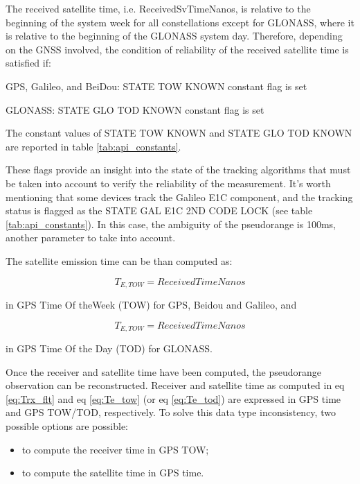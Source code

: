 The received satellite time, i.e. ReceivedSvTimeNanos, is relative to the beginning of the system week for all constellations except for GLONASS, where it is relative to the beginning of the GLONASS system day. Therefore, depending on the GNSS involved, the condition of
reliability of the received satellite time is satisfied if:

\begin{itemize}
	{\item  GPS, Galileo, and BeiDou: STATE TOW KNOWN constant flag is set}
	{\item  GLONASS: STATE GLO TOD KNOWN constant flag is set}
\end{itemize}

The constant values of STATE TOW KNOWN and STATE GLO TOD KNOWN are reported in table \ref{tab:api_constants}.

These flags provide an insight into the state of the tracking algorithms that must be taken into account to verify the reliability of the measurement. It’s worth mentioning that some devices track the Galileo E1C component, and the tracking status is flagged as the STATE GAL E1C 2ND CODE LOCK (see table \ref{tab:api_constants}). In this case, the ambiguity of the pseudorange is 100ms, another parameter to take into account.

The satellite emission time can be than computed as:

\begin{equation}
	T_{E,TOW} = ReceivedTimeNanos
	\label{eq:Te_tow}
\end{equation}
 
in GPS Time Of theWeek (TOW) for GPS, Beidou and Galileo, and

\begin{equation}
	T_{E,TOW} = ReceivedTimeNanos
	\label{eq:Te_tod}
\end{equation}

in GPS Time Of the Day (TOD) for GLONASS.

Once the receiver and satellite time have been computed, the pseudorange observation can be reconstructed. Receiver and satellite time as computed in eq \ref{eq:Trx_flt} and eq \ref{eq:Te_tow} (or eq \ref{eq:Te_tod}) are expressed in GPS time and GPS TOW/TOD, respectively. To solve this data type inconsistency, two possible options are possible:

\begin{itemize}
	\item to compute the receiver time in GPS TOW;
	\item to compute the satellite time in GPS time.
\end{itemize}

